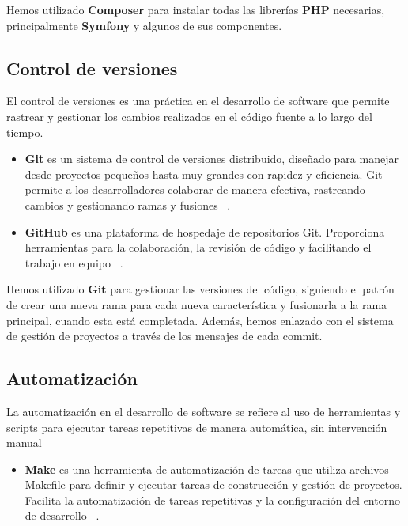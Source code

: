 Hemos utilizado  \textbf{Composer} para instalar todas las librerías  \textbf{PHP} necesarias, principalmente
\textbf{Symfony} y algunos de sus componentes.

\subsection{Control de versiones}

El control de versiones es una práctica en el desarrollo de software que permite rastrear y gestionar los cambios
realizados en el código fuente a lo largo del tiempo.

\begin{itemize}
    \item \textbf{Git}
    es un sistema de control de versiones distribuido, diseñado para manejar desde proyectos pequeños hasta muy grandes
    con rapidez y eficiencia.
    Git permite a los desarrolladores colaborar de manera efectiva, rastreando cambios y gestionando ramas y fusiones
    ~\cite{url_git}.
    \item \textbf{GitHub} es una plataforma de hospedaje de repositorios Git.
    Proporciona herramientas para la colaboración, la revisión de código y facilitando el trabajo en equipo
    ~\cite{url_github}.
\end{itemize}

Hemos utilizado \textbf{Git} para gestionar las versiones del código, siguiendo el patrón de crear una nueva rama para
cada nueva característica y fusionarla a la rama principal, cuando esta está completada.
Además, hemos enlazado con el sistema de gestión de proyectos a través de los mensajes de cada commit.

\subsection{Automatización}

La automatización en el desarrollo de software se refiere al uso de herramientas y scripts para ejecutar tareas
repetitivas de manera automática, sin intervención manual

\begin{itemize}
    \item \textbf{Make}
    es una herramienta de automatización de tareas que utiliza archivos Makefile para definir y ejecutar tareas de
    construcción y gestión de proyectos.
    Facilita la automatización de tareas repetitivas y la configuración del entorno de desarrollo
    ~\cite{url_make}.
\end{itemize}


